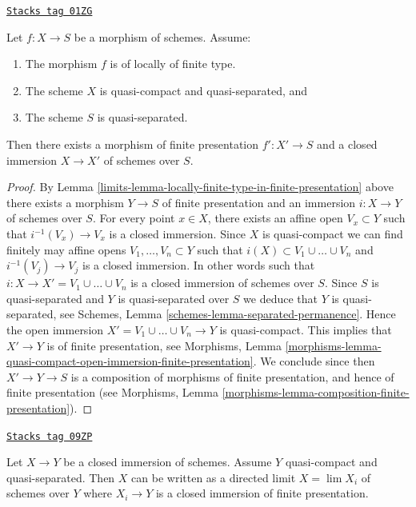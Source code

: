 \begin{lemma}
\label{limits-lemma-finite-type-closed-in-finite-presentation}
\href{https://stacks.math.columbia.edu/tag/01ZG}{\texttt{Stacks tag 01ZG}}

Let $f : X \to S$ be a morphism of schemes.
Assume:
\begin{enumerate}
\item The morphism $f$ is of locally of finite type.
\item The scheme $X$ is quasi-compact and quasi-separated, and
\item The scheme $S$ is quasi-separated.
\end{enumerate}
Then there exists a morphism of finite presentation
$f' : X' \to S$ and a closed immersion $X \to X'$ of schemes over $S$.
\end{lemma}

\begin{proof}

By Lemma \ref{limits-lemma-locally-finite-type-in-finite-presentation} above
there exists a morphism $Y \to S$ of finite presentation and an
immersion $i : X \to Y$ of schemes over $S$.
For every point $x \in X$, there exists an affine open
$V_x \subset Y$ such that $i^{-1}(V_x) \to V_x$ is a
closed immersion. Since $X$ is quasi-compact we can find
finitely may affine opens $V_1, \ldots, V_n \subset Y$
such that $i(X) \subset V_1 \cup \ldots \cup V_n$ and
$i^{-1}(V_j) \to V_j$ is a closed immersion. In other words
such that $i : X \to X' = V_1 \cup \ldots \cup V_n$ is a
closed immersion of schemes over $S$.
Since $S$ is quasi-separated and $Y$ is quasi-separated over $S$
we deduce that $Y$ is quasi-separated, see
Schemes, Lemma \ref{schemes-lemma-separated-permanence}.
Hence the open immersion $X' = V_1 \cup \ldots \cup V_n \to Y$
is quasi-compact. This implies that
$X' \to Y$ is of finite presentation, see
Morphisms,
Lemma \ref{morphisms-lemma-quasi-compact-open-immersion-finite-presentation}.
We conclude since then $X' \to Y \to S$ is a composition of morphisms
of finite presentation, and hence of finite presentation (see
Morphisms, Lemma \ref{morphisms-lemma-composition-finite-presentation}).
\end{proof}

\begin{lemma}
\label{limits-lemma-closed-is-limit-closed-and-finite-presentation}
\href{https://stacks.math.columbia.edu/tag/09ZP}{\texttt{Stacks tag 09ZP}}

Let $X \to Y$ be a closed immersion of schemes. Assume $Y$ quasi-compact and
quasi-separated. Then $X$ can be written as a directed limit $X = \lim X_i$
of schemes over $Y$ where $X_i \to Y$ is a closed immersion
of finite presentation.
\end{lemma}

